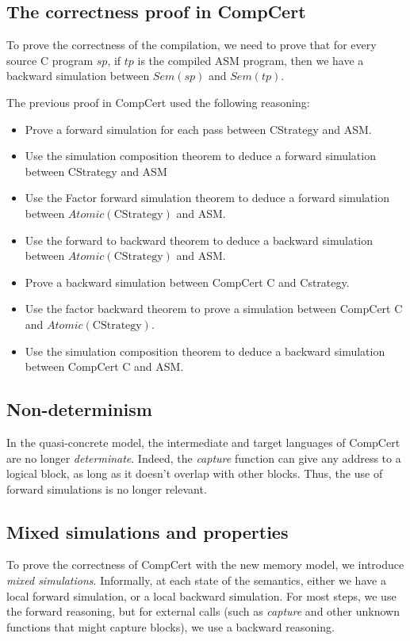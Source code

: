 \subsection{The correctness proof in CompCert}
To prove the correctness of the compilation, we need to prove that for every source C program $sp$, if $tp$ is the compiled ASM program, then we have a backward simulation between $\mathit{Sem}(sp)$ and $\mathit{Sem}(tp)$.

The previous proof in CompCert used the following reasoning:
\begin{itemize}
\item Prove a forward simulation for each pass between CStrategy and ASM.
\item Use the simulation composition theorem to deduce a forward simulation between CStrategy and ASM
\item Use the Factor forward simulation theorem to deduce a forward simulation between $\mathit{Atomic}(\text{CStrategy})$ and ASM.
\item Use the forward to backward theorem to deduce a backward simulation between $\mathit{Atomic}(\text{CStrategy})$ and ASM.
\item Prove a backward simulation between CompCert C and Cstrategy.
\item Use the factor backward theorem to prove a simulation between CompCert C and $\mathit{Atomic}(\text{CStrategy})$.
\item Use the simulation composition theorem to deduce a backward simulation between CompCert C and ASM.
\end{itemize}

\subsection{Non-determinism}
In the quasi-concrete model, the intermediate and target languages of CompCert are no longer \textit{determinate}. Indeed, the \textit{capture} function can give any address to a logical block, as long as it doesn't overlap with other blocks.
Thus, the use of forward simulations is no longer relevant.

\subsection{Mixed simulations and properties}
To prove the correctness of CompCert with the new memory model, we introduce \textit{mixed simulations}. Informally, at each state of the semantics, either we have a local forward simulation, or a local backward simulation. For most steps, we use the forward reasoning, but for external calls (such as \textit{capture} and other unknown functions that might capture blocks), we use a backward reasoning.

